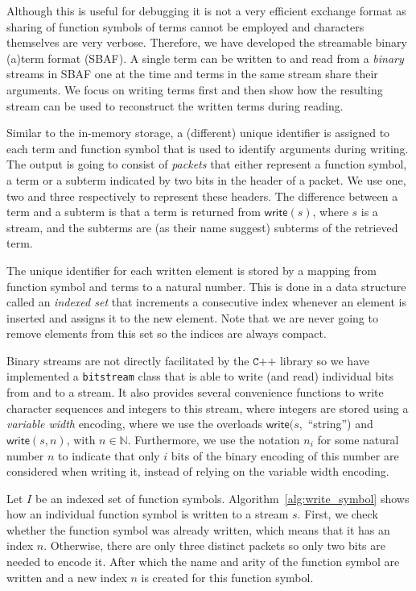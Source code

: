 \documentclass[10pt,a4paper]{article}
\theoremstyle{definition}
\newcommand{\naturalnumbers}{\mathbb{N}}
\newcommand{\streamout}{\textsf{write}}
\newcommand{\cpp}{\texttt{C++}}
\begin{document}
Although this is useful for debugging it is not a very efficient exchange format as sharing of function symbols of terms cannot be employed and characters themselves are very verbose.
Therefore, we have developed the streamable binary (a)term format (SBAF).
A single term can be written to and read from a \emph{binary} streams in SBAF one at the time and terms in the same stream share their arguments.
We focus on writing terms first and then show how the resulting stream can be used to reconstruct the written terms during reading.

Similar to the in-memory storage, a (different) unique identifier is assigned to each term and function symbol that is used to identify arguments during writing.
The output is going to consist of \emph{packets} that either represent a function symbol, a term or a subterm indicated by two bits in the header of a packet.
We use one, two and three respectively to represent these headers.
The difference between a term and a subterm is that a term is returned from $\streamout(s)$, where $s$ is a stream, and the subterms are (as their name suggest) subterms of the retrieved term.

The unique identifier for each written element is stored by a mapping from function symbol and terms to a natural number.
This is done in a data structure called an \emph{indexed set} that increments a consecutive index whenever an element is inserted and assigns it to the new element.
Note that we are never going to remove elements from this set so the indices are always compact.

Binary streams are not directly facilitated by the $\cpp$ library so we have implemented a \texttt{bitstream} class that is able to write (and read) individual bits from and to a stream.
It also provides several convenience functions to write character sequences and integers to this stream, where integers are stored using a \emph{variable width} encoding, where we use the overloads $\streamout(s,$ ``string'') and $\streamout(s, n)$, with $n \in \naturalnumbers$.
Furthermore, we use the notation $n_i$ for some natural number $n$ to indicate that only $i$ bits of the binary encoding of this number are considered when writing it, instead of relying on the variable width encoding.

Let $I$ be an indexed set of function symbols.
Algorithm~\ref{alg:write_symbol} shows how an individual function symbol is written to a stream $s$.
First, we check whether the function symbol was already written, which means that it has an index $n$.
Otherwise, there are only three distinct packets so only two bits are needed to encode it.
After which the name and arity of the function symbol are written and a new index $n$ is created for this function symbol.
\end{document}
